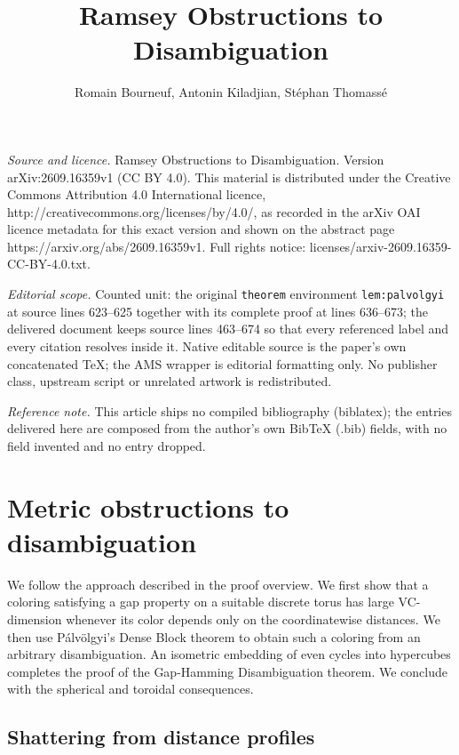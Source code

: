 \documentclass[10pt,a4paper]{amsart}
\begin{document}
\title[Ramsey Obstructions to Disambiguation]{Ramsey Obstructions to Disambiguation}
\author{Romain Bourneuf, Antonin Kiladjian, Stéphan Thomassé}
\date{}
\maketitle
\noindent\emph{Source and licence.} Ramsey Obstructions to Disambiguation. Version arXiv:2609.16359v1 (CC BY 4.0). This material is distributed under the Creative Commons Attribution 4.0 International licence, http://creativecommons.org/licenses/by/4.0/, as recorded in the arXiv OAI licence metadata for this exact version and shown on the abstract page https://arxiv.org/abs/2609.16359v1. Full rights notice: licenses/arxiv-2609.16359-CC-BY-4.0.txt.\par\smallskip
\noindent\textit{Editorial scope.} Counted unit: the original \texttt{theorem} environment \texttt{lem:palvolgyi} at source lines 623--625 together with its complete proof at lines 636--673; the delivered document keeps source lines 463--674 so that every referenced label and every citation resolves inside it. Native editable source is the paper's own concatenated TeX; the AMS wrapper is editorial formatting only. No publisher class, upstream script or unrelated artwork is redistributed.
\par\smallskip\noindent\textit{Reference note.} This article ships no compiled bibliography (biblatex); the entries delivered here are composed from the author's own BibTeX (.bib) fields, with no field invented and no entry dropped.
\section{Metric obstructions to disambiguation}

We follow the approach described in the proof overview.
We first show that a coloring satisfying a gap property on a suitable discrete torus has large VC-dimension whenever its color depends only on the coordinatewise distances. 
We then use Pálvölgyi’s Dense Block theorem to obtain such a coloring from an arbitrary disambiguation. 
An isometric embedding of even cycles into hypercubes completes the proof of the Gap-Hamming Disambiguation theorem. 
We conclude with the spherical and toroidal consequences.

\subsection{Shattering from distance profiles}
\end{document}
